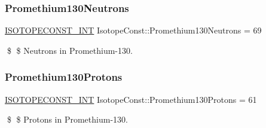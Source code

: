 \subsubsection{\texorpdfstring{Promethium130\+Neutrons}{Promethium130Neutrons}}
{\footnotesize\ttfamily \mbox{\hyperlink{group___isotope_const-_macros_ga5f18360b3e99483a35c32d789e62621c}{I\+S\+O\+T\+O\+P\+E\+C\+O\+N\+S\+T\+\_\+\+I\+NT}} Isotope\+Const\+::\+Promethium130\+Neutrons = 69}

\$ \$ Neutrons in Promethium-\/130. \mbox{\label{group___isotope_const-_promethium-_pm130_gae7be20c6eb95b1ca943224061fedf3bc}} 
\subsubsection{\texorpdfstring{Promethium130\+Protons}{Promethium130Protons}}
{\footnotesize\ttfamily \mbox{\hyperlink{group___isotope_const-_macros_ga5f18360b3e99483a35c32d789e62621c}{I\+S\+O\+T\+O\+P\+E\+C\+O\+N\+S\+T\+\_\+\+I\+NT}} Isotope\+Const\+::\+Promethium130\+Protons = 61}

\$ \$ Protons in Promethium-\/130. 